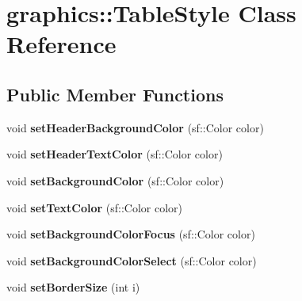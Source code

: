 \hypertarget{classgraphics_1_1_table_style}{\section{graphics\-:\-:Table\-Style Class Reference}
\label{classgraphics_1_1_table_style}
}
\subsection*{Public Member Functions}
\begin{DoxyCompactItemize}
\item 
\hypertarget{classgraphics_1_1_table_style_a26298b28cdb57d9224817dd4ead976a1}{void {\bfseries set\-Header\-Background\-Color} (sf\-::\-Color color)}\label{classgraphics_1_1_table_style_a26298b28cdb57d9224817dd4ead976a1}

\item 
\hypertarget{classgraphics_1_1_table_style_a6ae3548a544129e79ec0a5a0c8f94c75}{void {\bfseries set\-Header\-Text\-Color} (sf\-::\-Color color)}\label{classgraphics_1_1_table_style_a6ae3548a544129e79ec0a5a0c8f94c75}

\item 
\hypertarget{classgraphics_1_1_table_style_a1dce1f42126ab7ed78f6c852aa4c1a31}{void {\bfseries set\-Background\-Color} (sf\-::\-Color color)}\label{classgraphics_1_1_table_style_a1dce1f42126ab7ed78f6c852aa4c1a31}

\item 
\hypertarget{classgraphics_1_1_table_style_abc20cae64ae0fb4ae54ae331c59893b2}{void {\bfseries set\-Text\-Color} (sf\-::\-Color color)}\label{classgraphics_1_1_table_style_abc20cae64ae0fb4ae54ae331c59893b2}

\item 
\hypertarget{classgraphics_1_1_table_style_aca31f0f3883e33b4558be59771733bbe}{void {\bfseries set\-Background\-Color\-Focus} (sf\-::\-Color color)}\label{classgraphics_1_1_table_style_aca31f0f3883e33b4558be59771733bbe}

\item 
\hypertarget{classgraphics_1_1_table_style_a4779c774ee0ce4f8b7bfd9698e1e1826}{void {\bfseries set\-Background\-Color\-Select} (sf\-::\-Color color)}\label{classgraphics_1_1_table_style_a4779c774ee0ce4f8b7bfd9698e1e1826}

\item 
\hypertarget{classgraphics_1_1_table_style_adac59e66c6ef446155f2fcc2bd6920e3}{void {\bfseries set\-Border\-Size} (int i)}\label{classgraphics_1_1_table_style_adac59e66c6ef446155f2fcc2bd6920e3}


\end{DoxyCompactItemize}
